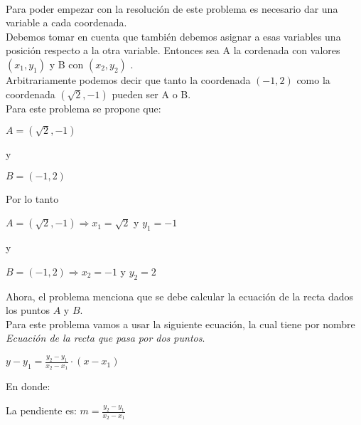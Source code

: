 \documentclass[12pt]{article}
\begin{document}
{} \\

Para poder empezar con la resolución de este problema es necesario dar una variable a cada coordenada. \\

Debemos tomar en cuenta que también debemos asignar a esas variables una posición respecto a la otra variable. Entonces sea A la cordenada con valores $\left(x_1,y_1\right)$ y B con $\left(x_2,y_2\right)$ .\\

Arbitrariamente podemos decir que tanto la coordenada $\left(-1,2\right)$ como la coordenada $\left(\sqrt{2},-1\right)$ pueden ser A o B. \\

Para este problema se propone que:

\begin{center}
    $A = \left(\sqrt{2},-1\right)$
\end{center}
\begin{center}
 y   
\end{center}
\begin{center}
    $B = \left(-1,2\right)$
\end{center}

Por lo tanto
\begin{center}
 $A = \left(\sqrt{2},-1\right) \Rightarrow x_1 = \sqrt{2}$ y $ y_1 = -1$ 
\end{center}
\begin{center}
 y
\end{center}
\begin{center}
 $B = \left(-1,2\right) \Rightarrow x_2 = -1$ y $ y_2 = 2$ 
\end{center}

Ahora, el problema menciona que se debe calcular la ecuación de la recta dados los puntos $A$ y $B$. \\

Para este problema vamos a usar la siguiente ecuación, la cual tiene por nombre \textit{Ecuación de la recta que pasa por dos puntos}.
\newpage

\begin{center}
 $y-y_1=\frac{y_2-y_1}{x_2-x_1}\cdot (x-x_1)$ 
\end{center}

En donde:
\begin{center}
La pendiente es:
 $ m = \frac{y_2-y_1}{x_2-x_1}$ 
\end{center}
\end{document}
